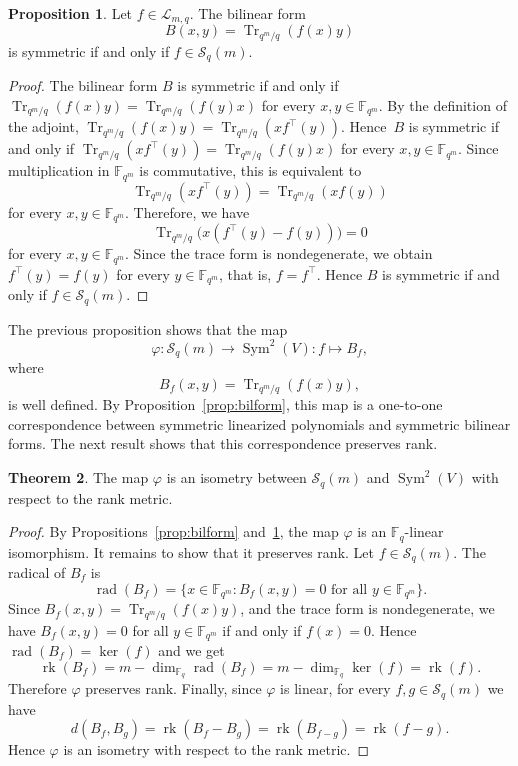 \documentclass[11pt,a4paper,reqno]{article}
\numberwithin{equation}{section}
\theoremstyle{definition}
\newtheorem{theorem}{Theorem}[section]
\newtheorem{proposition}[theorem]{Proposition}
\renewcommand{\longrightarrow}{\to}
\begin{document}
\begin{proposition}\label{prop:bilform2}
Let \(f\in\mathcal L_{m,q}\). The bilinear form
\[
B(x,y)=\operatorname{Tr}_{q^m/q}(f(x)y)
\]
is symmetric if and only if \(f\in\mathcal S_q(m)\).
\end{proposition}
\begin{proof}
The bilinear form \(B\) is symmetric if and only if $\operatorname{Tr}_{q^m/q}(f(x)y)
=
\operatorname{Tr}_{q^m/q}(f(y)x)$ for every \(x,y\in\mathbb F_{q^m}\). By the definition of the adjoint, $\operatorname{Tr}_{q^m/q}(f(x)y) =
\operatorname{Tr}_{q^m/q}(x f^\top(y))$.
Hence~\(B\) is symmetric if and only if $\operatorname{Tr}_{q^m/q}(x f^\top(y))
=
\operatorname{Tr}_{q^m/q}(f(y)x)$
for every \(x,y\in\mathbb F_{q^m}\). Since multiplication in
\(\mathbb F_{q^m}\) is commutative, this is equivalent to
\[
\operatorname{Tr}_{q^m/q}(x f^\top(y))
=
\operatorname{Tr}_{q^m/q}(x f(y))
\]
for every \(x,y\in\mathbb F_{q^m}\). Therefore, we have 
\[
\operatorname{Tr}_{q^m/q}\bigl(x(f^\top(y)-f(y))\bigr)=0
\]
for every \(x,y\in\mathbb F_{q^m}\). Since the trace form is nondegenerate,
we obtain \(f^\top(y)=f(y)\) for every \(y\in\mathbb F_{q^m}\), that is,
\(f=f^\top\). Hence \(B\) is symmetric if and only if
\(f\in\mathcal S_q(m)\).
\end{proof}

The previous proposition shows that the map
\[
\varphi:\mathcal S_q(m)\longrightarrow \operatorname{Sym}^2(V):f\longmapsto B_f,
\]
where
\[
B_f(x,y)=\operatorname{Tr}_{q^m/q}(f(x)y),
\]
is well defined. By Proposition~\ref{prop:bilform}, this map is a one-to-one correspondence
between symmetric linearized polynomials and symmetric bilinear forms. The next
result shows that this correspondence preserves rank.

\begin{theorem}
The map \(\varphi\) is an isometry between \(\mathcal S_q(m)\) and
\(\operatorname{Sym}^2(V)\) with respect to the rank metric.
\end{theorem}
\begin{proof}
By Propositions~\ref{prop:bilform} and~\ref{prop:bilform2}, the map \(\varphi\) is an
\(\mathbb F_q\)-linear isomorphism. It remains to show that it preserves rank. Let \(f\in\mathcal S_q(m)\). The radical of \(B_f\) is
\[
\operatorname{rad}(B_f)
=
\{x\in\mathbb F_{q^m}: B_f(x,y)=0 \text{ for all } y\in\mathbb F_{q^m}\}.
\]
Since $B_f(x,y)=\operatorname{Tr}_{q^m/q}(f(x)y)$, and the trace form is nondegenerate, we have $B_f(x,y)=0$ for all $y\in\mathbb F_{q^m}$ if and only if
$f(x)=0$. Hence $\operatorname{rad}(B_f)=\ker(f)$ and we get
\[
\operatorname{rk}(B_f)
=
m-\dim_{\mathbb F_q}\operatorname{rad}(B_f)
=
m-\dim_{\mathbb F_q}\ker(f)
=
\operatorname{rk}(f).
\]
Therefore \(\varphi\) preserves rank.
Finally, since \(\varphi\) is linear, for every \(f,g\in\mathcal S_q(m)\) we have
\[
d(B_f,B_g)
=
\operatorname{rk}(B_f-B_g)
=
\operatorname{rk}(B_{f-g})
=
\operatorname{rk}(f-g).
\]
Hence \(\varphi\) is an isometry with respect to the rank metric.
\end{proof}
\end{document}
